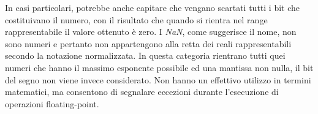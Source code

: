 \documentclass[Lau, oneside]{sapthesis}%
\begin{document}
\newline
In casi particolari, potrebbe anche capitare che vengano scartati tutti i bit che costituivano il numero, con il risultato che quando si rientra nel range rappresentabile il valore ottenuto è zero.
\newline \newline
I \textit{NaN}, come suggerisce il nome, non sono numeri e pertanto non appartengono alla retta dei reali rappresentabili secondo la notazione normalizzata.
\newline
In questa categoria rientrano tutti quei numeri che hanno il massimo esponente possibile ed una mantissa non nulla, il bit del segno non viene invece considerato. 
\newline
Non hanno un effettivo utilizzo in termini matematici, ma consentono di segnalare eccezioni durante l'esecuzione di operazioni floating-point.
\end{document}
